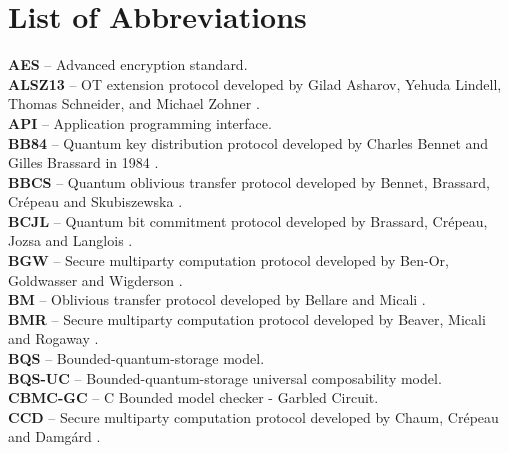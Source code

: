 \chapter*{List of Abbreviations}


\textbf{AES} -- Advanced encryption standard.
\vspace{0.5cm}\\
\textbf{ALSZ13} -- OT extension protocol developed by Gilad Asharov, Yehuda Lindell, Thomas Schneider, and Michael Zohner \cite{ALSZ13}.
\vspace{0.5cm}\\
\textbf{API} -- Application programming interface.
\vspace{0.5cm}\\
\textbf{BB84} -- Quantum key distribution protocol developed by Charles Bennet and Gilles Brassard in 1984 \cite{BB84}.
\vspace{0.5cm}\\
\textbf{BBCS} -- Quantum oblivious transfer protocol developed by Bennet, Brassard, Crépeau and Skubiszewska \cite{BBCS92}.
\vspace{0.5cm}\\
\textbf{BCJL} -- Quantum bit commitment protocol developed by Brassard, Crépeau, Jozsa and Langlois \cite{BCJL93}.
\vspace{0.5cm}\\
\textbf{BGW} -- Secure multiparty computation protocol developed by Ben-Or, Goldwasser and Wigderson \cite{BGW88}.
\vspace{0.5cm}\\
\textbf{BM} -- Oblivious transfer protocol developed by Bellare and Micali \cite{BM89}.
\vspace{0.5cm}\\
\textbf{BMR} -- Secure multiparty computation protocol developed by Beaver, Micali and Rogaway \cite{BMR90}.
\vspace{0.5cm}\\
\textbf{BQS} -- Bounded-quantum-storage model.
\vspace{0.5cm}\\
\textbf{BQS-UC} -- Bounded-quantum-storage universal composability model.
\vspace{0.5cm}\\
\textbf{CBMC-GC} -- C Bounded model checker - Garbled Circuit.
\vspace{0.5cm}\\
\textbf{CCD} -- Secure multiparty computation protocol developed by Chaum, Crépeau and Damg\'{a}rd \cite{CCD88}.
